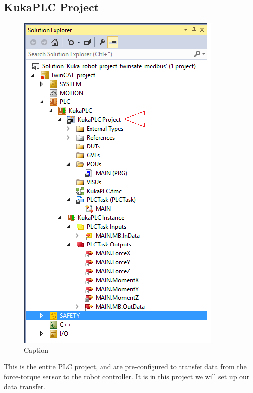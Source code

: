 \documentclass{article}
\begin{document}
\newpage

\subsection{KukaPLC Project}
\begin{figure}[!h]
    \centering
    \includegraphics[scale=0.7]{pictures/TC3_KukaPLC.png}
    \caption{Caption}
    \label{fig:my_label}
\end{figure}
This is the entire PLC project, and are pre-configured to transfer data from the force-torque sensor to the robot controller. It is in this project we will set up our data transfer.  

\newpage
\end{document}
